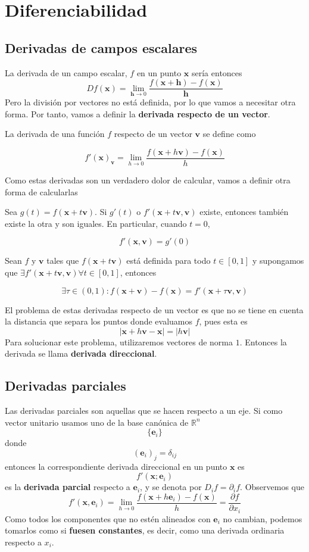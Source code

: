 \documentclass{./Calculo.tex}
\begin{document}
\chapter{Diferenciabilidad}
\section{Derivadas de campos escalares}
La derivada de un campo escalar, $f$ en un punto $\mathbf{x}$ sería entonces
$$
Df(\mathbf{x})=\lim_{ \mathbf{h} \to 0 } \frac{f(\mathbf{x}+\mathbf{h})-f(\mathbf{x})}{\mathbf{h}}
$$
Pero la división por vectores no está definida, por lo que vamos a necesitar otra forma.
Por tanto, vamos a definir la \textbf{derivada respecto de un vector}.
\begin{defin}
La derivada de una función $f$ respecto de un vector $\mathbf{v}$ se define como
 
$$
f'(\mathbf{x})_{\mathbf{v}} = \lim_{ h \to 0 } \frac{f(\mathbf{x}+h\mathbf{v})-f(\mathbf{x})}{h} 
$$
\end{defin}
Como estas derivadas son un verdadero dolor de calcular, vamos a definir otra forma de calcularlas
\begin{teorema}
Sea $g(t)=f(\mathbf{x}+t\mathbf{v})$. Si $g'(t)$ o $f'(\mathbf{x}+t\mathbf{v}, \mathbf{v})$ existe, entonces también existe la otra y son iguales. En particular, cuando $t=0$,
 
$$
f'(\mathbf{x},\mathbf{v})=g'(0)
$$
\end{teorema}
\begin{teorema}
Sean $f$ y $\mathbf{v}$ tales que $f(\mathbf{x}+t\mathbf{v})$ está definida para todo $t\in [0,1]$ y supongamos que $\exists f'(\mathbf{x}+t\mathbf{v},\mathbf{v}) \forall t\in [0,1]$, entonces
 
$$
\exists \tau \in(0,1):f(\mathbf{x}+\mathbf{v})-f(\mathbf{x})=f'(\mathbf{x}+\tau \mathbf{v},\mathbf{v})
$$
\end{teorema}
El problema de estas derivadas respecto de un vector es que no se tiene en cuenta la distancia que separa los puntos donde evaluamos $f$, pues esta es
$$
\lvert \mathbf{x}+h\mathbf{v}-\mathbf{x} \rvert =\lvert h\mathbf{v} \rvert
$$
Para solucionar este problema, utilizaremos vectores de norma $1$. Entonces la derivada se llama \textbf{derivada direccional}.
\section{Derivadas parciales}
Las derivadas parciales son aquellas que se hacen respecto a un eje. Si como vector unitario usamos uno de la base canónica de $\mathbb{R}^{n}$
$$
\{ \mathbf{e}_{i} \}
$$
donde
$$
(\mathbf{e}_{i})_{j}=\delta_{ij}
$$
entonces la correspondiente derivada direccional en un punto $\mathbf{x}$ es
$$
f'(\mathbf{x};\mathbf{e}_{i})
$$
es la \textbf{derivada parcial} respecto a $\mathbf{e}_{i}$, y se denota por $D_{i}f=\partial_{i}f$.
Observemos que
$$
\boxed{
f'(\mathbf{x},\mathbf{e}_{i})=\lim_{ h \to 0 } \frac{f(\mathbf{x}+h \mathbf{e}_{i})-f(\mathbf{x})}{h}= \frac{ \partial f }{ \partial x_{i} }
}
$$
Como todos los componentes que no estén alineados con $\mathbf{e}_{i}$ no cambian, podemos tomarlos como si \textbf{fuesen constantes}, es decir, como una derivada ordinaria respecto a $x_{i}$.
\end{document}
